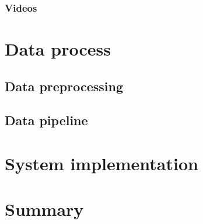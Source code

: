 \documentclass[thesis.tex]{subfiles}
\begin{document}
\subsubsection{Videos}




\section{Data process} \label{data_pipeline}

\subsection{Data preprocessing}

\subsection{Data pipeline}


\section{System implementation} \label{systemimplementation}


\section{Summary} \label{03summary}
\end{document}
